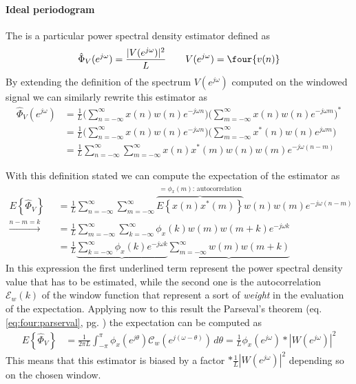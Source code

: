 	\paragraph{Ideal periodogram} The  is a particular power spectral density estimator defined as
	\begin{equation}
		\hat \Phi_V(e^{j\omega}) = \frac{|V(e^{j\omega})|^2}{L} \qquad V(e^{j\omega}) = \four{v(n)}
	\end{equation}
	By extending the definition of the spectrum $V(e^{j\omega})$ computed on the windowed signal we can similarly rewrite this estimator as
	\begin{align*}
		\hat \Phi_V(e^{j\omega}) & = \frac 1 L \Big( \sum_{n=-\infty}^\infty x(n) w(n) e^{-j\omega n} \Big)( \sum_{m=-\infty}^\infty x(n) w(n) e^{-j\omega m} \Big)^* \\ & = \frac 1 L \Big( \sum_{n=-\infty}^\infty x(n) w(n) e^{-j\omega n} \Big)( \sum_{m=-\infty}^\infty x^*(n) w(n) e^{j\omega m} \Big) \\ 
		& = \frac 1 L \sum_{n=-\infty}^\infty\sum_{m=-\infty}^\infty x(n) x^*(m) w(n) w(m) e^{-j\omega(n-m)}
	\end{align*}

	With this definition stated we can compute the expectation of the estimator as
	\begin{align*}
		E\left\{ \hat \Phi_V \right\} & = \frac 1 L \sum_{n=-\infty}^\infty\sum_{m=-\infty}^\infty \overbrace{E\left\{x(n) x^*(m)\right\}}^{= \phi_x(m) \textrm{: autocorrelation}} w(n) w(m) e^{-j\omega(n-m)} \\
		\xrightarrow{n-m=k} \quad & = \frac 1 L \sum_{m=-\infty}^\infty \sum_{k=-\infty}^\infty \phi_x(k) w(m) w(m+k) e^{-j\omega k} \\
		& = \frac 1 L \underbrace{\sum_{k=-\infty}^\infty \phi_x(k) e^{-j\omega k}} \underbrace{\sum_{m=-\infty}^\infty w(m) w(m+k)} 
	\end{align*}
	In this expression the first underlined term represent the power spectral density value that has to be estimated, while the second one is the autocorrelation $\mathcal E_w(k)$ of the window function that represent a sort of \textit{weight} in the evaluation of the expectation. Applying now to this result the Parseval's theorem (eq. \ref{eq:four:parserval}, pg. \pageref{eq:four:parserval}) the expectation can be computed as
	\begin{align*}
		E\left\{ \hat \Phi_V \right\} & = \frac 1 {2\pi L} \int_{-\pi}^\pi \phi_x (e^{j\theta}) \mathcal C_w(e^{j(\omega-\theta)}) \, d\theta = \frac 1 L \phi_x (e^{j\omega}) * |W(e^{j\omega})|^2
	\end{align*}
	This means that this estimator is biased by a factor $*\frac1 L |W(e^{j\omega})|^2$ depending so on the chosen window.
	
